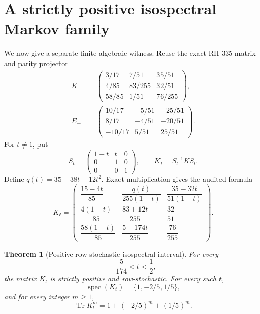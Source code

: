 \documentclass[11pt]{article}
\newtheorem{theorem}{Theorem}[section]
\theoremstyle{remark}
\newcommand{\Tr}{\operatorname{Tr}}
\begin{document}
\section{A strictly positive isospectral Markov family}

We now give a separate finite algebraic witness.  Reuse the exact RH-335
matrix and parity projector
\begin{align}
 K&=\begin{pmatrix}
 3/17&7/51&35/51\\
 4/85&83/255&32/51\\
 58/85&1/51&76/255
 \end{pmatrix},\label{eq:K}\\
 E_-&=\begin{pmatrix}
 10/17&-5/51&-25/51\\
 8/17&-4/51&-20/51\\
 -10/17&5/51&25/51
 \end{pmatrix}.\label{eq:E}
\end{align}
For $t\ne1$, put
\begin{equation}\label{eq:S-family}
 S_t=\begin{pmatrix}1-t&t&0\\0&1&0\\0&0&1\end{pmatrix},
 \qquad K_t=S_t^{-1}KS_t.
\end{equation}
Define $q(t)=35-38t-12t^2$.  Exact multiplication gives the audited formula
\begin{equation}\label{eq:Kt-formula}
 K_t=\begin{pmatrix}
 \dfrac{15-4t}{85}&\dfrac{q(t)}{255(1-t)}
   &\dfrac{35-32t}{51(1-t)}\\[0.8em]
 \dfrac{4(1-t)}{85}&\dfrac{83+12t}{255}&\dfrac{32}{51}\\[0.8em]
 \dfrac{58(1-t)}{85}&\dfrac{5+174t}{255}&\dfrac{76}{255}
 \end{pmatrix}.
\end{equation}

\begin{theorem}[Positive row-stochastic isospectral interval]
\label{thm:positive-family}
For every
\begin{equation}\label{eq:sufficient-interval}
 \boxed{-\frac5{174}<t<\frac12,}
\end{equation}
the matrix $K_t$ is strictly positive and row-stochastic.  For every such
$t$,
\begin{equation}\label{eq:spectrum}
 \operatorname{spec}(K_t)=\{1,-2/5,1/5\},
\end{equation}
and for every integer $m\ge1$,
\begin{equation}\label{eq:all-traces}
 \boxed{
 \Tr K_t^m=1+(-2/5)^m+(1/5)^m.}
\end{equation}
\end{theorem}
\end{document}
